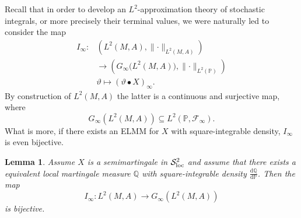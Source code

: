 \documentclass[11pt,a4paper,twoside,openany]{report}
\numberwithin{equation}{section}
\newcommand{\diff}{\mathrm{d}}
\theoremstyle{plain} %
\newtheorem{lemma}[theorem]{Lemma}
\theoremstyle{definition} %
\theoremstyle{remark} %
\begin{document}
Recall that in order to develop an \(L^2\)-approximation theory of stochastic integrals, or more precisely their terminal values, we were naturally led to consider the map 
\begin{align*}
I_{\infty}:&(L^2(M,A),\lVert\cdot\rVert_{L^2(M,A)})\\
&\to(G_{\infty}\big(L^2(M,A)\big),\lVert\cdot\rVert_{L^2(\mathbb{P})})\\&
    \vartheta\mapsto (\vartheta\bullet X)_{\infty}.
\end{align*}
By construction of \(L^2(M,A)\) the latter is a continuous and surjective map,
where
\begin{equation*}
G_{\infty}(L^2(M,A))\subseteq L^2(\mathbb{P},\mathcal{F}_{\infty}).
\end{equation*}
What is more, if there exists an ELMM for \(X\) with square-integrable density, \(I_{\infty}\) is even bijective.
\begin{lemma}\label{lemma:integral map is bijective}
    Assume \(X\) is a semimartingale in \(\mathcal{S}^2_{\rm{loc}}\) and assume that there exists a equivalent local martingale measure \(\mathbb{Q}\) with square-integrable density \(\frac{\diff \mathbb{Q}}{\diff \mathbb{P}}\). Then the map
    \begin{equation*}
        I_{\infty}:L^2(M,A)\to G_{\infty}(L^2(M,A))
    \end{equation*}
    is bijective.
\end{lemma}
\end{document}
